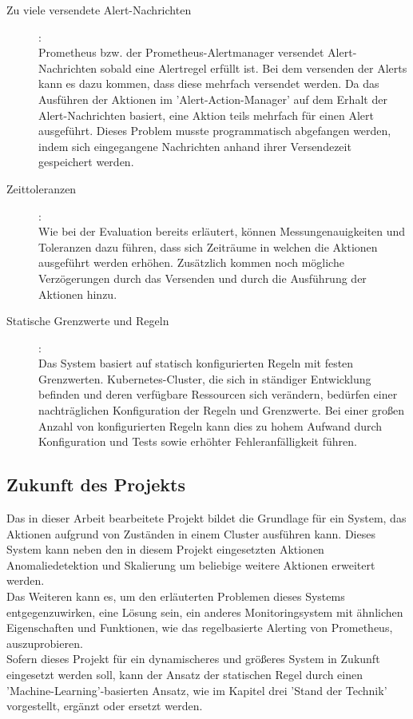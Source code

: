 \documentclass[a4paper,10pt]{scrartcl}
\begin{document}
\begin{description}

\item[Zu viele versendete Alert-Nachrichten]:\\

Prometheus bzw. der Prometheus-Alertmanager versendet Alert-Nachrichten sobald eine Alertregel erfüllt ist. Bei dem versenden der Alerts kann es dazu kommen, dass diese mehrfach versendet werden. Da das Ausführen der Aktionen im 'Alert-Action-Manager' auf dem Erhalt der Alert-Nachrichten basiert, eine Aktion teils mehrfach für einen Alert ausgeführt. Dieses Problem musste programmatisch abgefangen werden, indem sich eingegangene Nachrichten anhand ihrer Versendezeit gespeichert werden.

\item[Zeittoleranzen]:\\

Wie bei der Evaluation bereits erläutert, können Messungenauigkeiten und Toleranzen dazu führen, dass sich Zeiträume in welchen die Aktionen ausgeführt werden erhöhen. Zusätzlich kommen noch mögliche Verzögerungen durch das Versenden und durch die Ausführung der Aktionen hinzu.

\item[Statische Grenzwerte und Regeln]:\\

Das System basiert auf statisch konfigurierten Regeln mit festen Grenzwerten. Kubernetes-Cluster, die sich in ständiger Entwicklung befinden und deren verfügbare Ressourcen sich verändern, bedürfen einer nachträglichen Konfiguration der Regeln und Grenzwerte. Bei einer großen Anzahl von konfigurierten Regeln kann dies zu hohem Aufwand durch Konfiguration und Tests sowie erhöhter Fehleranfälligkeit führen.

\end{description}

 
\subsection{Zukunft des Projekts}

Das in dieser Arbeit bearbeitete Projekt bildet die Grundlage für ein System, das Aktionen aufgrund von Zuständen in einem Cluster ausführen kann. Dieses System kann neben den in diesem Projekt eingesetzten Aktionen Anomaliedetektion und Skalierung um beliebige weitere Aktionen erweitert werden.\\
Das Weiteren kann es, um den erläuterten Problemen dieses Systems entgegenzuwirken, eine Lösung sein, ein anderes Monitoringsystem mit ähnlichen Eigenschaften und Funktionen, wie das regelbasierte Alerting von Prometheus, auszuprobieren.\\
Sofern dieses Projekt für ein dynamischeres und größeres System in Zukunft eingesetzt werden soll, kann der Ansatz der statischen Regel durch einen 'Machine-Learning'-basierten Ansatz, wie im Kapitel drei 'Stand der Technik' vorgestellt, ergänzt oder ersetzt werden.
\end{document}
